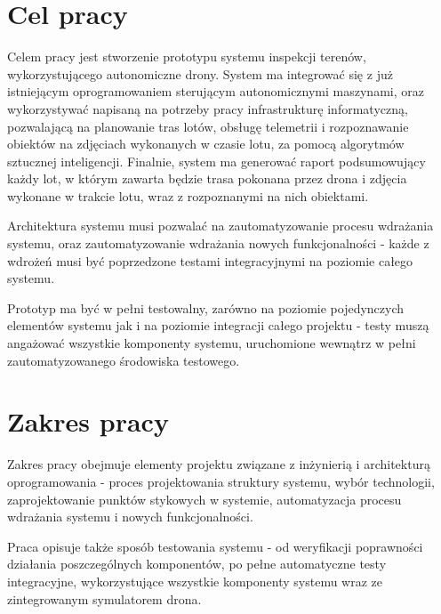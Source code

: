 
\newpage
\section{Cel pracy} \label{intro_objective}

Celem pracy jest stworzenie prototypu systemu inspekcji terenów, wykorzystującego
autonomiczne drony. System ma integrować się z już istniejącym oprogramowaniem
sterującym autonomicznymi maszynami, oraz wykorzystywać napisaną na potrzeby pracy
infrastrukturę informatyczną, pozwalającą na planowanie tras lotów, obsługę telemetrii
i rozpoznawanie obiektów na zdjęciach wykonanych w czasie lotu, za pomocą algorytmów
sztucznej inteligencji. Finalnie, system ma generować raport podsumowujący każdy lot,
w którym zawarta będzie trasa pokonana przez drona i zdjęcia wykonane w trakcie lotu,
wraz z rozpoznanymi na nich obiektami. 

Architektura systemu musi pozwalać na zautomatyzowanie procesu wdrażania
systemu, oraz zautomatyzowanie wdrażania nowych funkcjonalności - każde
z wdrożeń musi być poprzedzone testami integracyjnymi na poziomie całego systemu. 

Prototyp ma być w pełni testowalny, zarówno na poziomie pojedynczych
elementów systemu jak i na poziomie integracji całego projektu - testy muszą
angażować wszystkie komponenty systemu, uruchomione wewnątrz w pełni
zautomatyzowanego środowiska testowego.

\section{Zakres pracy} \label{intro_scope}

Zakres pracy obejmuje elementy projektu związane z
inżynierią i architekturą oprogramowania - proces projektowania struktury systemu,
wybór technologii, zaprojektowanie punktów stykowych w systemie, automatyzacja
procesu wdrażania systemu i nowych funkcjonalności.

Praca opisuje także sposób testowania systemu - od weryfikacji poprawności działania
poszczególnych komponentów, po pełne automatyczne testy integracyjne, wykorzystujące 
wszystkie komponenty systemu wraz ze zintegrowanym symulatorem drona. 
